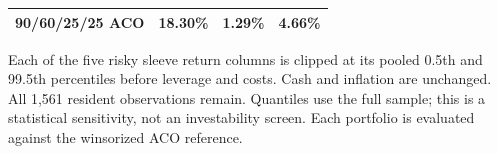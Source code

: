 \begin{table}[p]
{\begin{tabular}{lrrr}
90/60/25/25 ACO & 18.30\% & 1.29\% & 4.66\% \\
\bottomrule\end{tabular}}
\par\smallskip\begin{minipage}{0.97\textwidth}\footnotesize Each of the five risky sleeve return columns is clipped at its pooled 0.5th and 99.5th percentiles before leverage and costs. Cash and inflation are unchanged. All 1,561 resident observations remain. Quantiles use the full sample; this is a statistical sensitivity, not an investability screen. Each portfolio is evaluated against the winsorized ACO reference.\end{minipage}\end{table}
